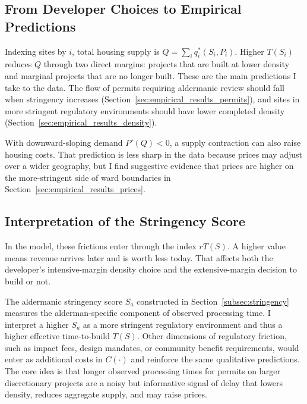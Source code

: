 \subsection{From Developer Choices to Empirical Predictions}
\label{subsec:empirical_predictions}

Indexing sites by $i$, total housing supply is $Q = \sum_i q_i^*(S_i,P_i)$.
Higher $T(S_i)$ reduces $Q$ through two direct margins: projects that are built at lower density and marginal projects that are no longer built.
These are the main predictions I take to the data.
The flow of permits requiring aldermanic review should fall when stringency increases (Section~\ref{sec:empirical_results_permits}), and sites in more stringent regulatory environments should have lower completed density (Section~\ref{sec:empirical_results_density}).

With downward-sloping demand $P'(Q) < 0$, a supply contraction can also raise housing costs.
That prediction is less sharp in the data because prices may adjust over a wider geography, but I find suggestive evidence that prices are higher on the more-stringent side of ward boundaries in Section~\ref{sec:empirical_results_prices}.

\subsection{Interpretation of the Stringency Score}
\label{subsec:stringency_interpretation}

In the model, these frictions enter through the index $rT(S)$.
A higher value means revenue arrives later and is worth less today.
That affects both the developer's intensive-margin density choice and the extensive-margin decision to build or not.

The aldermanic stringency score $S_a$ constructed in Section~\ref{subsec:stringency} measures the alderman-specific component of observed processing time.
I interpret a higher $S_a$ as a more stringent regulatory environment and thus a higher effective time-to-build $T(S)$.
Other dimensions of regulatory friction, such as impact fees, design mandates, or community benefit requirements, would enter as additional costs in $C(\cdot)$ and reinforce the same qualitative predictions.
The core idea is that longer observed processing times for permits on larger discretionary projects are a noisy but informative signal of delay that lowers density, reduces aggregate supply, and may raise prices.
